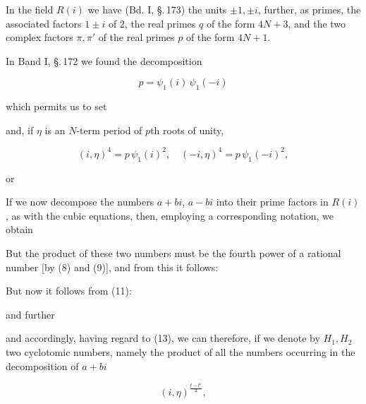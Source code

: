 In the field $R(i)$ we have (Bd. I, \S.\,173) the units $\pm 1, \pm i$, further,
as primes, the associated factors $1\pm i$ of 2, the real primes
$q$ of the form $4N+3$, and the two complex factors $\pi, \pi'$ of the real
primes $p$ of the form $4N+1$.

In Band I, \S.\,172 we found the decomposition

\[
p = \psi_1(i)\,\psi_1(-i)
\]

which permits us to set


and, if $\eta$ is an $N$-term period of $p$th
roots of unity,

\[
(i,\eta)^4 = p\,\psi_1(i)^2, \quad (-i,\eta)^4 = p\,\psi_1(-i)^2,
\]

or


If we now decompose the numbers $a+bi$, $a-bi$ into their prime factors
in $R(i)$, as with the cubic equations, then, employing a corresponding
notation, we obtain


But the product of these two numbers must be the fourth power of a rational
number [by (8) and (9)], and from this it follows:


But now it follows from (11):


and further


and accordingly, having regard to (13), we can therefore, if we denote by $H_1, H_2$
two cyclotomic numbers, namely the product of all the numbers occurring in the
decomposition of $a+bi$

\[
(i,\eta)^{\frac{t-t'}{2}},
\]
